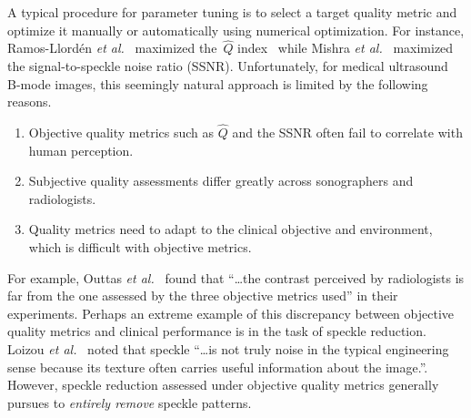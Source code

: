 A typical procedure for parameter tuning is to select a target quality metric and optimize it manually or automatically using numerical optimization.
For instance, Ramos-Llord\'en \textit{et al.}~\cite{ramos-llorden_anisotropic_2015} maximized the~\(\widehat{Q}\) index~\cite{tay_ultrasound_2006} while Mishra \textit{et al.}~\cite{mishra_edge_2018} maximized the signal-to-speckle noise ratio (SSNR).
Unfortunately, for medical ultrasound B-mode images, this seemingly natural approach is limited by the following reasons.
\vspace{0.05in}
\begin{enumerate}
  \item[\ding{228}] Objective quality metrics such as \(\widehat{Q}\) and the SSNR often fail to correlate with human perception.
    \vspace{0.05in}
  \item[\ding{228}] Subjective quality assessments differ greatly across sonographers and radiologists.
    \vspace{0.05in}
  \item[\ding{228}] Quality metrics need to adapt to the clinical objective and environment, which is difficult with objective metrics.
\end{enumerate}
For example, Outtas \textit{et al.}~\cite{outtas_subjective_2018} found that ``\ldots the contrast perceived by radiologists is far from the one assessed by the three objective metrics used'' in their experiments.
Perhaps an extreme example of this discrepancy between objective quality metrics and clinical performance is in the task of speckle reduction.
Loizou \textit{et al.}~\cite{loizou_comparative_2005} noted that speckle ``\ldots is not truly noise in the typical engineering sense because its texture often carries useful information about the image.''.
However, speckle reduction assessed under objective quality metrics generally pursues to \textit{entirely remove} speckle patterns.

